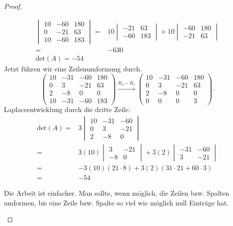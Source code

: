 \begin{proof}
\begin{parts}
\begin{align*}
			\begin{vmatrix}
				10 & -60 & 180 \\ 0 & -21 & 63 \\ 10 & -60 & 183
			\end{vmatrix}=&10
			\begin{vmatrix}
				-21 & 63 \\ -60 & 183
			\end{vmatrix}
			+10
			\begin{vmatrix}
				-60 & 180 \\ -21 & 63
			\end{vmatrix}\\
			=&-630\\
			\text{det}(A)=-54
		\end{align*}
		Jetzt führen wir eine Zeilenumformung durch.
		\[
			\begin{pmatrix} 10 & -31 & -60 & 180 \\ 0 & 3 & -21 & 63 \\ 2 & -8 & 0 & 0 \\ 10 & -31 & -60 & 183 \end{pmatrix} \xrightarrow{R_4-R_1}\begin{pmatrix} 10 & -31 & -60 & 180 \\ 0 & 3 & -21 & 63 \\ 2 & -8 & 0 & 0 \\ 0 & 0 & 0 & 3 \end{pmatrix} 
		.\] 
		Laplaceentwicklung durch die dritte Zeile:
		\begin{align*}
			\text{det}(A)=&3
			\begin{vmatrix}
				10 & -31 & -60 \\ 0 & 3 & -21 \\ 2 & -8 & 0
			\end{vmatrix}\\
			=&3(10)
			\begin{vmatrix}
				3 & -21 \\ -8 & 0
			\end{vmatrix}+3(2)
			\begin{vmatrix}
				-31 & -60 \\ 3 & -21
			\end{vmatrix}\\
			=&-3(10)(21\cdot 8)+3(2)(31\cdot 21+60\cdot 3)\\
			=&-54
		\end{align*}
	\item Die Arbeit ist einfacher. Man sollte, wenn möglich, die Zeilen bzw. Spalten umformen, bis eine Zeile bzw. Spalte so viel wie möglich null Einträge hat.\qedhere
	\end{parts}
\end{proof}
